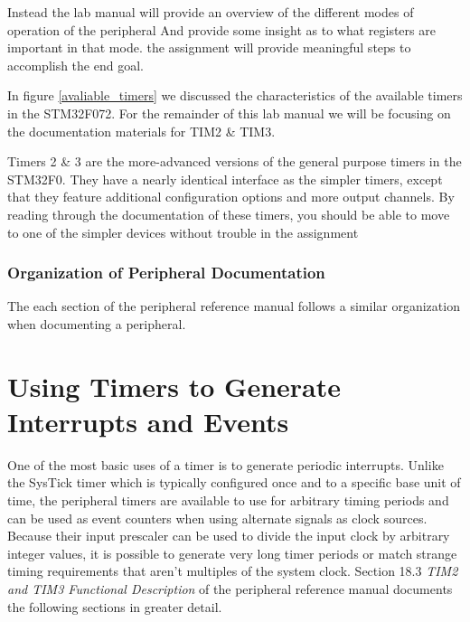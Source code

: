 \documentclass[11pt,fleqn]{book} %
\begin{document}
    Instead the lab manual will provide an overview of the different modes of operation of the peripheral And provide some insight as to what registers are important in that mode. the assignment will provide meaningful steps to accomplish the end goal. 

    In figure \ref{avaliable_timers} we discussed the characteristics of the available timers in the STM32F072. For the remainder of this lab manual we will be focusing on the documentation materials for TIM2 \& TIM3. 
    
    Timers 2 \& 3 are the more-advanced versions of the general purpose timers in the STM32F0. They have a nearly identical interface as the simpler timers, except that they feature additional configuration options and more output channels. By reading through the documentation of these timers, you should be able to move to one of the simpler devices without trouble in the assignment 
    
    \subsubsection{Organization of Peripheral Documentation}
    The each section of the peripheral reference manual follows a similar organization when documenting a peripheral. 
    
%    
%    

\section{Using Timers to Generate Interrupts and Events}

    One of the most basic uses of a timer is to generate periodic interrupts. Unlike the SysTick timer which is typically configured once and to a specific base unit of time, the peripheral timers are available to use for arbitrary timing periods and can be used as event counters when using alternate signals as clock sources. Because their input prescaler can be used to divide the input clock by arbitrary integer values, it is possible to generate very long timer periods or match strange timing requirements that aren't multiples of the system clock. Section 18.3 \textit{TIM2 and TIM3 Functional Description} of the peripheral reference manual documents the following sections in greater detail. 
\end{document}
